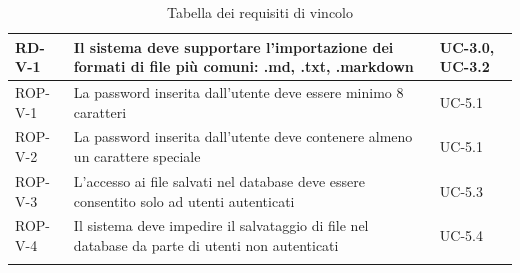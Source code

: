\documentclass[11pt,a4paper]{article}
\begin{document}
\begin{longtable}{|p{}|>{\raggedright\arraybackslash}p{}|p{}|}
\hline
RD-V-1 & Il sistema deve supportare l'importazione dei formati di file più comuni: .md, .txt, .markdown & UC-3.0, UC-3.2 \\
\hline
ROP-V-1 & La password inserita dall'utente deve essere minimo 8 caratteri & UC-5.1 \\
\hline
ROP-V-2 & La password inserita dall'utente deve contenere almeno un carattere speciale & UC-5.1 \\
\hline
ROP-V-3 & L'accesso ai file salvati nel database deve essere consentito solo ad utenti autenticati & UC-5.3 \\
\hline
ROP-V-4 & Il sistema deve impedire il salvataggio di file nel database da parte di utenti non autenticati & UC-5.4 \\
\hline
\addlinespace[1em]
\caption{Tabella dei requisiti di vincolo}
\end{longtable}


\newpage
\end{document}
